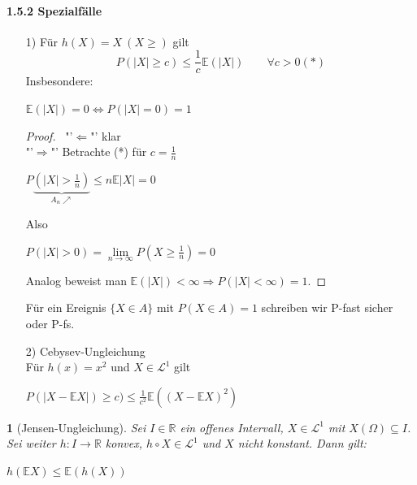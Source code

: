 \documentclass[10pt,a4paper]{report}
\numberwithin{equation}{section}
\numberwithin{figure}{section}
\theoremstyle{plain}
\theoremstyle{definition}
\theoremstyle{remark}
\theoremstyle{plain}
\newtheorem{prop}[thm]{\protect\propositionname}
\providecommand{\propositionname}{Satz}
\newcommand{\1}{ \mathbb{1} } %
\begin{document}
\paragraph{1.5.2 Spezialfälle}
\begin{itemize}
\item[1)] Für $h(X)=X ~(X\geq)$ gilt
  \[P(|X|\geq c) \leq \frac{1}{c}\mathbb{E}(|X|) \qquad \forall c >0 (*)\]
  Insbesondere:
  \begin{center}
    $\mathbb{E}(|X|)=0 \Leftrightarrow P(|X|=0)=1 $
  \end{center}
  \begin{proof} \
    "'$\Leftarrow$"' klar\\
    "'$\Rightarrow$"' Betrachte (*) für $c=\frac{1}{n}$
    \begin{center}
      $P\underbrace{\left(|X|>\frac{1}{n}\right)}_{A_n\nearrow} \leq
      n\mathbb{E}|X|=0$
    \end{center}
    Also
    \begin{center}
      $P(|X|>0)=\lim\limits_{n \to \infty}P\left(X\geq
        \frac{1}{n}\right)=0$
    \end{center}
    Analog beweist man $\mathbb{E}(|X|)<\infty \Rightarrow
    P(|X|<\infty)=1$.
  \end{proof}
  Für ein Ereignis $\{X\in A\}$ mit $P(X \in A)=1$ schreiben wir P-fast sicher oder P-fs.
  \item[2)] Cebysev-Ungleichung\\
  Für $h(x)=x^2$ und $X \in \mathcal{L}^1$ gilt
  \begin{center}
    $P(|X-\mathbb{E}X|)\geq c) \leq
    \frac{1}{c^2}\mathbb{E}((X-\mathbb{E}X)^2)$
  \end{center}
\end{itemize}
\begin{prop}[Jensen-Ungleichung] 
  Sei $I\in \mathbb{R}$ ein offenes Intervall, $X \in \mathcal{L}^1$
  mit $X(\Omega)\subseteq I$. Sei weiter $h:I\to\mathbb{R}$ konvex,
  $h\circ X \in \mathcal{L}^1$ und $X$ nicht konstant. Dann gilt:
  \begin{center}
    $h(\mathbb{E}X)\leq \mathbb{E}(h(X))$
  \end{center}
\end{prop}
\end{document}
